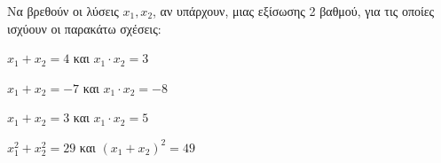 Να βρεθούν οι λύσεις $ x_1, x_2 $, αν υπάρχουν, μιας εξίσωσης 2 βαθμού, για τις οποίες ισχύουν οι παρακάτω σχέσεις:
\begin{alist}
\item $ x_1+x_2=4 $ και $ x_1\cdot x_2=3 $
\item $ x_1+x_2=-7 $ και $ x_1\cdot x_2=-8 $
\item $ x_1+x_2=3 $ και $ x_1\cdot x_2=5 $
\item $ x_1^2+x_2^2=29 $ και $ (x_1+x_2)^2=49 $
\end{alist}
